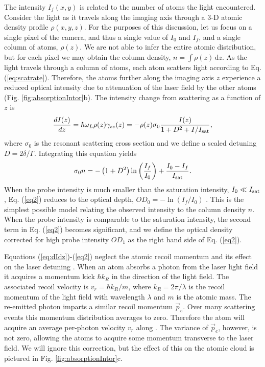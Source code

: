 \documentclass[12pt]{iopart}
\begin{document}
\par The intensity $I_f(x,y)$ is related to the number of atoms the light encountered. Consider the light as it travels along the imaging axis \ez{} through a 3-D atomic density profile $\rho(x,y,z)$. For the purposes of this discussion, let us focus on a single pixel of the camera, and thus a single value of $I_0$ and $I_f$, and a single column of atoms, $\rho(z)$. We are not able to infer the entire atomic distribution, but for each pixel we may obtain the column density, $n = \int \rho\left(z\right) \,\mathrm{d}z$. As the light travels through a column of atoms, each atom scatters light according to Eq. (\ref{eq:scatrate}). Therefore, the atoms further along the imaging axis $z$ experience a reduced optical intensity due to attenuation of the laser field by the other atoms (Fig. \ref{fig:absorptionIntor}b). The intensity change from scattering as a function of $z$ is
\begin{equation}
\frac{dI(z)}{dz}=\hbar\omega_L\rho(z)\gamma_{sc}(z)=-\rho(z)\sigma_0\frac{I(z)}{1+D^2 +I/I_{\rm{sat}}},
\label{eq:dIdz}
\end{equation}
where $\sigma_0$ is the resonant scattering cross section and we define a scaled detuning $D=2\delta/\Gamma$. Integrating this equation yields  \cite{Reinaudi07}
\begin{equation} 
\sigma_0 n = -\left(1+D^2\right)\ln\left(\frac{I_f}{I_0}\right) + \frac{I_0-I_f}{I_{\rm{sat}}}.
\label{eq2}
\end{equation}
When the probe intensity is much smaller than the saturation intensity, $I_0\ll I_{\rm{sat}}$, Eq. (\ref{eq2}) reduces to the optical depth, $OD_0=-\ln \left(I_f/I_0\right)$   \cite{Reinaudi07}. This is the simplest possible model relating the observed intensity to the column density $n$. When the probe intensity is comparable to the saturation intensity, the second term in Eq. (\ref{eq2}) becomes significant, and we define the optical density corrected for high probe intensity $OD_1$ as the right hand side of Eq.  (\ref{eq2}).
\par Equations (\ref{eq:dIdz})-(\ref{eq2}) neglect the atomic recoil momentum and its effect on the laser detuning \cite{Konstantinidis12}. When an atom absorbs a photon from the laser light field it acquires a momentum kick $\hbar k_R$ in the direction of the light field. The associated recoil velocity is $v_r=\hbar k_R/m$, where $k_R=2\pi/\lambda$ is the recoil momentum of the light field with wavelength $\lambda$ and $m$ is the atomic mass. The re-emitted photon imparts a similar recoil momentum $\vec{p}_e$. Over many scattering events this momentum distribution averages to zero. Therefore the atom  will acquire an average per-photon velocity $v_r$ along \ez{}.  The variance of $\vec{p}_e$, however, is not zero, allowing the atoms to acquire some momentum transverse to the laser field. We will ignore this correction, but the effect of this on the atomic cloud is pictured in Fig. \ref{fig:absorptionIntor}c. 
\end{document}
